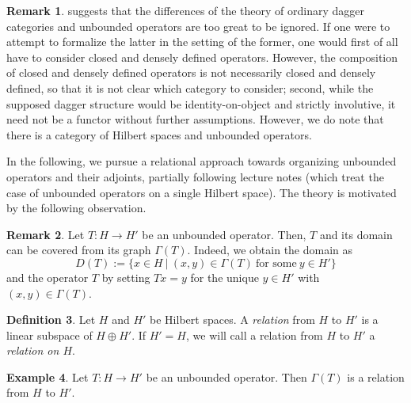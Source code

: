 \documentclass{article}
\numberwithin{equation}{section}
\theoremstyle{definition}
\newtheorem{definition}{Definition}[subsection]
\newtheorem{example}[definition]{Example}
\newtheorem{remark}[definition]{Remark}
\theoremstyle{theorem}
\begin{document}
\begin{remark}
     suggests that the differences of the theory of ordinary dagger categories and unbounded operators are 
    too great to be ignored. If one were to attempt to formalize the latter in the setting of the former, one would first of all have to consider 
    closed and densely defined operators. However, the composition of closed and densely defined operators is not necessarily closed and densely defined, 
    so that it is not clear which category to consider; second, while the supposed dagger structure would be identity-on-object and strictly involutive, 
    it need not be a functor without further assumptions. However, we do note that there is a category of Hilbert spaces and unbounded operators.
\end{remark}
In the following, we pursue a relational approach towards organizing unbounded operators and their adjoints, partially following lecture notes 
\cite{Remline2021unbounded} (which treat the case of unbounded operators on a single Hilbert space). The theory is motivated by the following
observation.
\begin{remark}
    Let $T \colon H \to H'$ be an unbounded operator. Then, $T$ and its domain can be covered from its graph $\Gamma(T)$. Indeed, we obtain the domain as 
    \begin{equation}
        D(T) := \{x \in H \ | \ (x,y) \in \Gamma(T) \ \text{for some} \ y \in H' \}
    \end{equation}
    and the operator $T$ by setting $Tx = y$ for the unique $y \in H'$ with $(x,y) \in \Gamma(T)$. 
\end{remark}
\begin{definition}
    Let $H$ and $H'$ be Hilbert spaces. A \emph{relation} from $H$ to $H'$ is a linear subspace of $H \oplus H'$. 
    If $H'=H$, we will call a relation from $H$ to $H'$ a \emph{relation on $H$}.
\end{definition}
\begin{example}
    Let $T \colon H \to H'$ be an unbounded operator. Then $\Gamma(T)$ is a relation from $H$ to $H'$.
\end{example}
\end{document}
